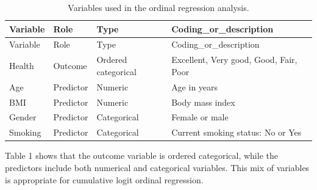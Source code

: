 \documentclass{article}
\begin{document}
\begin{longtable}[]{@{}
  >{\raggedright\arraybackslash}p{}
  >{\raggedright\arraybackslash}p{}
  >{\raggedright\arraybackslash}p{}
  >{\raggedright\arraybackslash}p{}@{}}
\caption{Variables used in the ordinal regression
analysis.}\tabularnewline
\toprule\noalign{}
\begin{minipage}[b]{\linewidth}\raggedright
Variable
\end{minipage} & \begin{minipage}[b]{\linewidth}\raggedright
Role
\end{minipage} & \begin{minipage}[b]{\linewidth}\raggedright
Type
\end{minipage} & \begin{minipage}[b]{\linewidth}\raggedright
Coding\_or\_description
\end{minipage} \\
\midrule\noalign{}
\endfirsthead
\toprule\noalign{}
\begin{minipage}[b]{\linewidth}\raggedright
Variable
\end{minipage} & \begin{minipage}[b]{\linewidth}\raggedright
Role
\end{minipage} & \begin{minipage}[b]{\linewidth}\raggedright
Type
\end{minipage} & \begin{minipage}[b]{\linewidth}\raggedright
Coding\_or\_description
\end{minipage} \\
\midrule\noalign{}
\endhead
\bottomrule\noalign{}
\endlastfoot
Health & Outcome & Ordered categorical & Excellent, Very good, Good,
Fair, Poor \\
Age & Predictor & Numeric & Age in years \\
BMI & Predictor & Numeric & Body mass index \\
Gender & Predictor & Categorical & Female or male \\
Smoking & Predictor & Categorical & Current smoking status: No or Yes \\
\end{longtable}

Table 1 shows that the outcome variable is ordered categorical, while
the predictors include both numerical and categorical variables. This
mix of variables is appropriate for cumulative logit ordinal regression.
\end{document}
